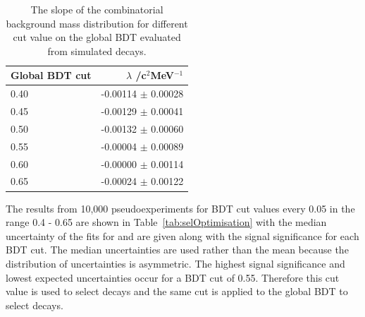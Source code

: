 \begin{table}[htbp]
\begin{center}
\begin{tabular}{lr}
\toprule \toprule
Global BDT cut & $\lambda$ /c$^{2}$MeV$^{-1}$\\ \midrule
0.40 & -0.00114 $\pm$ 0.00028 \\
0.45 & -0.00129 $\pm$ 0.00041 \\
0.50 & -0.00132 $\pm$ 0.00060 \\
0.55 & -0.00004 $\pm$ 0.00089 \\
0.60 & -0.00000 $\pm$ 0.00114 \\
0.65 & -0.00024 $\pm$ 0.00122 \\ \bottomrule \bottomrule
\end{tabular}
\vspace{0.7cm}
\caption{The slope of the combinatorial background mass distribution for different cut value on the global BDT evaluated from \bbbarmumux simulated decays.}
\label{tab:CBGSlopeBDT}
\end{center}
\vspace{-1.0cm}
\end{table}



The results from 10,000 pseudoexperiments for BDT cut values every 0.05 in the range 0.4 - 0.65 are shown in Table~\ref{tab:selOptimisation} with the median uncertainty of the fits for \tmumu and \invtmumu are given along with the signal significance for each BDT cut. The median uncertainties are used rather than the mean because the distribution of uncertainties is asymmetric. The highest signal significance and lowest expected uncertainties occur for a BDT cut of 0.55. Therefore this cut value is used to select \bsmumu decays and the same cut is applied to the global BDT to select \bhh decays. 


